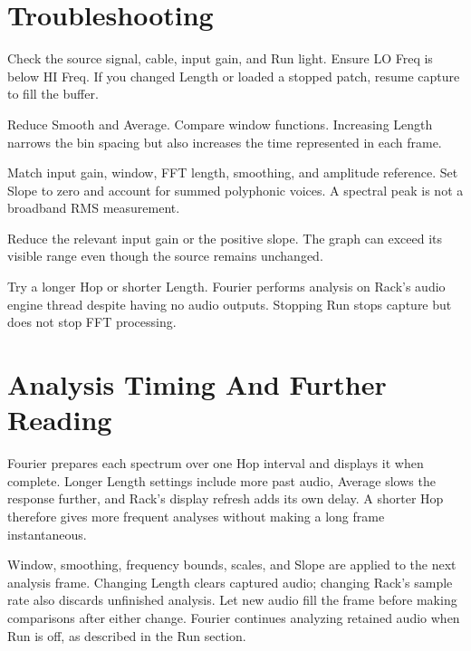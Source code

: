 \documentclass[12pt,letterpaper]{article}
\begin{document}
\clearpage
\section{Troubleshooting}

\begin{description}[style=nextline, leftmargin=0pt, labelwidth=0pt, labelsep=0pt]
  \item[No trace or a stale trace] Check the source signal, cable, input
  gain, and Run light. Ensure LO Freq is below HI Freq. If you changed
  Length or loaded a stopped patch, resume capture to fill the buffer.
  \item[Peaks are too broad or move slowly] Reduce Smooth and Average.
  Compare window functions. Increasing Length narrows the bin spacing but
  also increases the time represented in each frame.
  \item[Levels differ from another analyzer] Match input gain, window,
  FFT length, smoothing, and amplitude reference. Set Slope to zero and
  account for summed polyphonic voices. A spectral peak is not a broadband
  RMS measurement.
  \item[Display reaches the top] Reduce the relevant input gain or the
  positive slope. The graph can exceed its visible range even though the
  source remains unchanged.
  \item[Analysis uses too much CPU] Try a longer Hop or shorter Length.
  Fourier performs analysis on Rack's audio engine thread despite having no
  audio outputs. Stopping Run stops capture but does not stop FFT processing.
\end{description}

\section{Analysis Timing And Further Reading}

Fourier prepares each spectrum over one Hop interval and displays it when
complete. Longer Length settings include more past audio, Average slows the
response further, and Rack's display refresh adds its own delay. A shorter
Hop therefore gives more frequent analyses without making a long frame
instantaneous.

Window, smoothing, frequency bounds, scales, and Slope are applied to the
next analysis frame. Changing Length clears captured audio; changing Rack's sample rate
also discards unfinished analysis. Let new audio fill the frame before making
comparisons after either change. Fourier continues analyzing retained audio
when Run is off, as described in the Run section.
\end{document}
